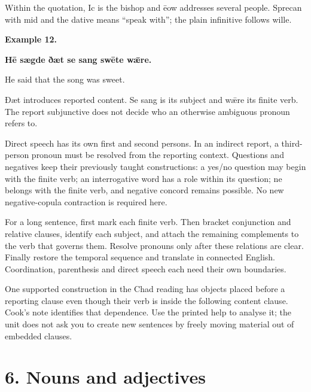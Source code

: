 Within the quotation, Ic is the bishop and ēow addresses several people. Sprecan with mid and the dative means “speak with”; the plain infinitive follows wille.

\textbf{Example 12.}

\textbf{Hē sægde ðæt se sang swēte wǣre.}

He said that the song was sweet.

Ðæt introduces reported content. Se sang is its subject and wǣre its finite verb. The report subjunctive does not decide who an otherwise ambiguous pronoun refers to.

Direct speech has its own first and second persons. In an indirect report, a third-person pronoun must be resolved from the reporting context. Questions and negatives keep their previously taught constructions: a yes/\allowbreak{}no question may begin with the finite verb; an interrogative word has a role within its question; ne belongs with the finite verb, and negative concord remains possible. No new negative-copula contraction is required here.

For a long sentence, first mark each finite verb. Then bracket conjunction and relative clauses, identify each subject, and attach the remaining complements to the verb that governs them. Resolve pronouns only after these relations are clear. Finally restore the temporal sequence and translate in connected English. Coordination, parenthesis and direct speech each need their own boundaries.

One supported construction in the Chad reading has objects placed before a reporting clause even though their verb is inside the following content clause. Cook’s note identifies that dependence. Use the printed help to analyse it; the unit does not ask you to create new sentences by freely moving material out of embedded clauses.

\section*{6. Nouns and adjectives}

